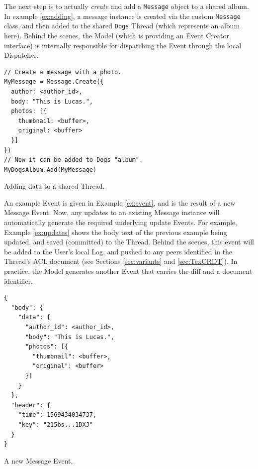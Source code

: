 \documentclass{textile}
\begin{document}
The next step is to actually \emph{create} and add a \texttt{Message} object to a shared album. In example \ref{ex:adding}, a message instance is created via the custom \texttt{Message} class, and then added to the shared \texttt{Dogs} Thread (which represents an album here). Behind the scenes, the Model (which is providing an Event Creator interface) is internally responsible for dispatching the Event through the local Dispatcher.

\begin{example}
  \begin{minipage}{.45\textwidth}
    \begin{lstlisting}
// Create a message with a photo.
MyMessage = Message.Create({
  author: <author_id>,
  body: "This is Lucas.",
  photos: [{
    thumbnail: <buffer>,
    original: <buffer>
  }]
})
// Now it can be added to Dogs "album".
MyDogsAlbum.Add(MyMessage)
    \end{lstlisting}
  \end{minipage}
  \caption{Adding data to a shared Thread.}
  \label{ex:adding}
\end{example}

An example Event is given in Example \ref{ex:event}, and is the result of a new Message Event. Now, any updates to an existing Message instance will automatically generate the required underlying update Events. For example, Example \ref{ex:updates} shows the body text of the previous example being updated, and saved (committed) to the Thread. Behind the scenes, this event will be added to the User's local Log, and pushed to any peers identified in the Thread's ACL document (see Sections \ref{sec:variants} and \ref{sec:TexCRDT}). In practice, the Model generates another Event that carries the diff and a document identifier.

\begin{example}
  \begin{minipage}{.45\textwidth}
    \begin{lstlisting}
{
  "body": {
    "data": {
      "author_id": <author_id>,
      "body": "This is Lucas.",
      "photos": [{
        "thumbnail": <buffer>,
        "original": <buffer>
      }]
    }
  },
  "header": {
    "time": 1569434034737,
    "key": "215bs...1DXJ"
  }
}
    \end{lstlisting}
  \end{minipage}
\caption{A new Message Event.}
\label{ex:event}
\end{example}
\end{document}
